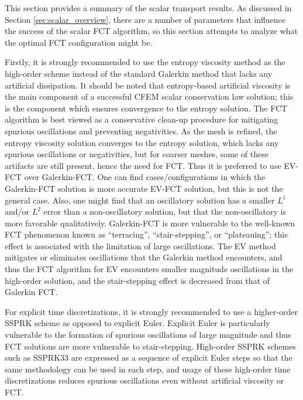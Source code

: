 This section provides a summary of the scalar transport results.
As discussed in Section \ref{sec:scalar_overview}, there are a number
of parameters that influence the success of the scalar FCT algorithm,
so this section attempts to analyze what the optimal FCT configuration
might be.

Firstly, it is strongly recommended to use the entropy viscosity method
as the high-order scheme instead of the standard Galerkin method that
lacks any artificial dissipation. It should be noted that entropy-based
artificial viscosity is the main component of a successful CFEM
scalar conservation law solution; this is the component which ensures
convergence to the entropy solution. The FCT algorithm is best viewed
as a conservative clean-up procedure for mitigating spurious oscillations
and preventing negativities. As the mesh is refined, the entropy viscosity
solution converges to the entropy solution, which lacks any spurious
oscillations or negativities, but for coarser meshes, some of these
artifacts are still present, hence the need for FCT. Thus it is preferred
to use EV-FCT over Galerkin-FCT. One can find cases/configurations in which
the Galerkin-FCT solution is more accurate EV-FCT solution, but this is
not the general case. Also, one might find that an oscillatory solution
has a smaller $L^1$ and/or $L^2$ error than a non-oscillatory solution,
but that the non-oscillatory is more favorable qualitatively. Galerkin-FCT
is more vulnerable to the well-known FCT phenomenon known as ``terracing'',
``stair-stepping'', or ``plateauing''; this effect is associated with
the limitation of large oscillations. The EV method mitigates or eliminates
oscillations that the Galerkin method encounters, and thus the FCT
algorithm for EV encounters smaller magnitude oscillations in the
high-order solution, and the stair-stepping effect is decreased from
that of Galerkin FCT.

For explicit time discretizations, it is strongly recommended to use a
higher-order SSPRK scheme as opposed to explicit Euler. Explicit Euler
is particularly vulnerable to the formation of spurious oscillations
of large magnitude and thus FCT solutions are more vulnerable to stair-stepping.
High-order SSPRK schemes such as SSPRK33 are expressed as a sequence of
explicit Euler steps so that the same methodology can be used in each
step, and usage of these high-order time discretizations reduces spurious
oscillations even without artificial viscosity or FCT.

